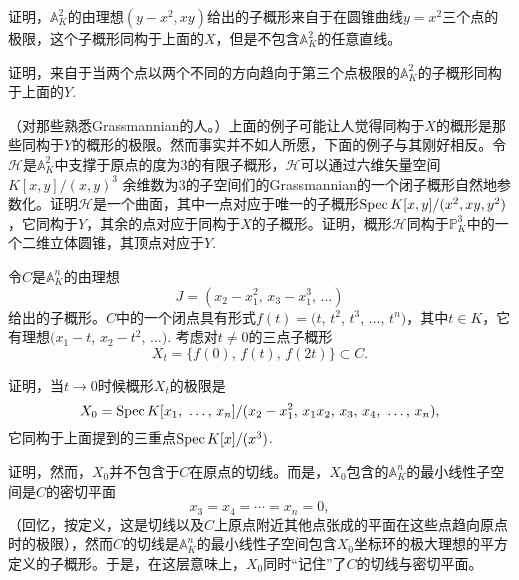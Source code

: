 \begin{exe}
	\begin{compactenum}[(i)]
		\item 证明，$\mathbb{A}_K^2$的由理想$(y-x^2,xy)$给出的子概形来自于在圆锥曲线$y=x^2$三个点的极限，这个子概形同构于上面的$X$，但是不包含$\mathbb{A}_K^2$的任意直线。


		\item 证明，来自于当两个点以两个不同的方向趋向于第三个点极限的$\mathbb{A}_K^2$的子概形同构于上面的$Y$.
	\end{compactenum}
\end{exe}

\begin{exe} （对那些熟悉Grassmannian的人。）上面的例子可能让人觉得同构于$X$的概形是那些同构于$Y$的概形的极限。然而事实并不如人所愿，下面的例子与其刚好相反。令$\mathscr{H}$是$\mathbb{A}_K^2$中支撑于原点的度为$3$的有限子概形，$\mathscr{H}$可以通过六维矢量空间$K[x,y]/(x,y)^3$ 余维数为$3$的子空间们的Grassmannian的一个闭子概形自然地参数化。证明$\mathscr{H}$是一个曲面，其中一点对应于唯一的子概形$\operatorname{Spec} K[x,y]/(x^2,xy,y^2)$，它同构于$Y$，其余的点对应于同构于$X$的子概形。证明，概形$\mathscr{H}$同构于$\mathbb{P}^3_K$中的一个二维立体圆锥，其顶点对应于$Y$.
\end{exe}

\begin{exe}
	令$C$是$\mathbb{A}_K^n$的由理想
	\[
	J=(x_2-x_1^2\text{, }x_3-x_1^3\text{, }\dots)
	\]
	给出的子概形。$C$中的一个闭点具有形式$f(t)=(t$, $t^2$, $t^3$, $\dots$, $t^n)$，其中$t\in K$，它有理想$(x_1-t$, $x_2-t^2$, $\dots)$. 考虑对$t\neq 0$的三点子概形
	\[
	X_t=\{f(0)\text{, }f(t)\text{, }f(2t)\}\subset C.
	\]

	\begin{compactenum}[(a)]
		\item 证明，当$t\to 0$时候概形$X_t$的极限是
		\[
		X_0=\operatorname{Spec} K[x_1\text{, }\dots\text{, }x_n]/(x_2-x_1^2\text{, }x_1x_2\text{, }x_3\text{, }x_4\text{, }\dots\text{, }x_n),
		\]
		它同构于上面提到的三重点$\operatorname{Spec} K[x]/(x^3)$.
		\item 证明，然而，$X_0$并不包含于$C$在原点的切线。而是，$X_0$包含的$\mathbb{A}_K^n$的最小线性子空间是$C$的密切平面
		\[
		x_3=x_4=\cdots=x_n=0,
		\]
		（回忆，按定义，这是切线以及$C$上原点附近其他点张成的平面在这些点趋向原点时的极限）\nottran，然而$C$的切线是$\mathbb{A}_K^n$的最小线性子空间包含$X_0$坐标环的极大理想的平方定义的子概形。于是，在这层意味上，$X_0$同时“记住”了$C$的切线与密切平面。
	\end{compactenum}
\end{exe}

